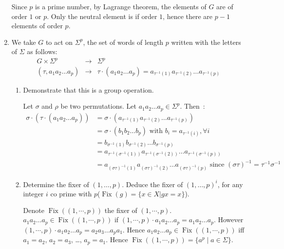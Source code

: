 \documentclass[a4paper,11pt]{exam}
\DeclareMathOperator{\Fix}{Fix}
\begin{document}
\begin{questions}
\begin{enumerate}
	\begin{solution}
		Since $p$ is a prime number, by Lagrange theorem, the elements of $G$ are of order $1$ or $p$.
		Only the neutral element is if order $1$, hence there are $p-1$ elements of order $p$.
	\end{solution}
	
	\item We take $ G $ to act on $ \Sigma^p $, the set of words of length $p $ written with the letters of $ \Sigma $ as follows:
	\[
	\begin{array}{lll}
	G \times \Sigma^p & \rightarrow & \Sigma^p \\
	(\tau, a_1a_2\dots a_p)& \to & \tau \cdot (a_1a_2\dots a_p) =
	a_{\tau^{-1}(1)} a_{\tau^{-1}(2)}\dots a_{\tau^{-1}(p)}
	\end{array}
	\]
	\begin{enumerate}
		\item Demonstrate that this is a group operation.
		
		\begin{solution}
			Let $\sigma$ and $\rho$ be two permutations.
			Let $a_1 a_2 \dots a_p \in \Sigma^p$. 
			Then~:
			\pagebreak
			\begin{align*}
			\sigma \cdot (\tau \cdot (a_1 a_2 \dots a_p))
			&= \sigma \cdot (a_{\tau^{-1}(1)}a_{\tau^{-1}(2)}
			\dots a_{\tau^{-1}(p)}) \\
			&= \sigma \cdot (b_1 b_2 \dots b_p)
			\text{ with } b_i=a_{\tau^{-1}(i)}, \forall i \\
			&= b_{\sigma^{-1}(1)} b_{\sigma^{-1}(2)}
			\dots b_{\sigma^{-1}(p)} \\
			&=  a_{\tau^{-1}(\sigma^{-1}(1))} a_{\tau^{-1}(\sigma^{-1}(2))}
			\dots a_{\tau^{-1}(\sigma^{-1}(p))} \\
			&= a_{(\sigma\tau)^{-1}(1)} a_{(\sigma\tau)^{-1}(2)}
			\dots a_{(\sigma\tau)^{-1}(p)}
			\text{ since } (\sigma\tau)^{-1} = \tau^{-1}\sigma^{-1}
			\end{align*}
		\end{solution}
		
		\item Determine the fixer of $(1,\dots,p)$. Deduce the fixer of $ (1, \dots, p)^i $, for any integer $ i $ co prime with $ p $($\Fix(g)=\{x\in X | gx=x\}$).
		
		\begin{solution}
			Denote $\Fix((1,\cdots,p))$ the fixer  of $(1,\cdots,p)$.
			$a_1 a_2 \dots a_p \in \Fix((1,\cdots,p))$  if
			$(1,\cdots,p) \cdot a_1 a_2 \dots a_p = a_1 a_2 \dots a_p$.
			However $(1,\cdots,p) \cdot a_1 a_2 \dots a_p = a_2 a_3 \dots a_p a_1$.
			Hence $a_1 a_2 \dots a_p \in \Fix((1,\cdots,p))$ iff $a_1=a_2$, $a_2=a_3$, \dots, $a_p=a_1$.
			Hence $\Fix((1,\cdots,p)) = \{ a^p \mid a \in \Sigma \}$.
			

\end{solution}
\end{enumerate}
\end{enumerate}
\end{questions}
\end{document}
